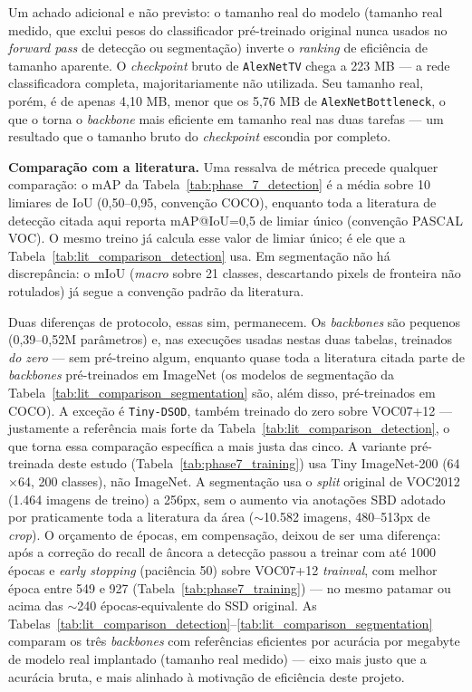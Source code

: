 \documentclass[conference]{IEEEtran}
\begin{document}
Um achado adicional e não previsto: o tamanho real do modelo (tamanho real medido, que exclui
pesos do classificador pré-treinado original nunca usados no \textit{forward pass} de detecção ou
segmentação) inverte o \textit{ranking} de eficiência de tamanho aparente. O \textit{checkpoint}
bruto de \texttt{AlexNetTV} chega a 223 MB — a rede classificadora completa, majoritariamente não
utilizada. Seu tamanho real, porém, é de apenas 4,10 MB, menor que os 5,76 MB de
\texttt{AlexNetBottleneck}, o que o torna o \textit{backbone} mais eficiente em tamanho real nas
duas tarefas — um resultado que o tamanho bruto do \textit{checkpoint} escondia por completo.

\textbf{Comparação com a literatura.} Uma ressalva de métrica precede qualquer comparação: o mAP da
Tabela~\ref{tab:phase_7_detection} é a média sobre 10 limiares de IoU (0,50--0,95, convenção COCO),
enquanto toda a literatura de detecção citada aqui reporta mAP@IoU=0,5 de limiar único (convenção
PASCAL VOC). O mesmo treino já calcula esse valor de limiar único; é ele que a
Tabela~\ref{tab:lit_comparison_detection} usa. Em segmentação não há discrepância: o mIoU
(\textit{macro} sobre 21 classes, descartando pixels de fronteira não rotulados) já segue a
convenção padrão da literatura.

Duas diferenças de protocolo, essas sim, permanecem. Os \textit{backbones} são pequenos
(0,39--0,52M parâmetros) e, nas execuções usadas nestas duas tabelas, treinados \emph{do zero} —
sem pré-treino algum, enquanto quase toda a literatura citada parte de \textit{backbones}
pré-treinados em ImageNet (os modelos de segmentação da Tabela~\ref{tab:lit_comparison_segmentation}
são, além disso, pré-treinados em COCO). A exceção é \texttt{Tiny-DSOD}, também treinado do zero
sobre VOC07+12 \cite{li2018tinydsod} — justamente a referência mais forte da
Tabela~\ref{tab:lit_comparison_detection}, o que torna essa comparação específica a mais justa das
cinco. A variante pré-treinada deste estudo (Tabela~\ref{tab:phase7_training}) usa Tiny
ImageNet-200 (64$\times$64, 200 classes), não ImageNet. A
segmentação usa o \textit{split} original de VOC2012 (1.464 imagens
de treino) a 256px, sem o aumento via anotações SBD adotado por praticamente toda a literatura da
área ($\sim$10.582 imagens, 480--513px de \textit{crop}). O orçamento de épocas, em compensação,
deixou de ser uma diferença: após a correção do recall de âncora a detecção passou a treinar com
até 1000 épocas e \textit{early stopping} (paciência 50) sobre VOC07+12 \textit{trainval}, com
melhor época entre 549 e 927 (Tabela~\ref{tab:phase7_training}) — no mesmo patamar ou acima das
$\sim$240 épocas-equivalente do SSD original.
As Tabelas~\ref{tab:lit_comparison_detection}--\ref{tab:lit_comparison_segmentation} comparam os
três \textit{backbones} com referências eficientes por acurácia por megabyte de modelo real
implantado (tamanho real medido) — eixo mais justo que a acurácia bruta, e mais alinhado à
motivação de eficiência deste projeto.
\end{document}
